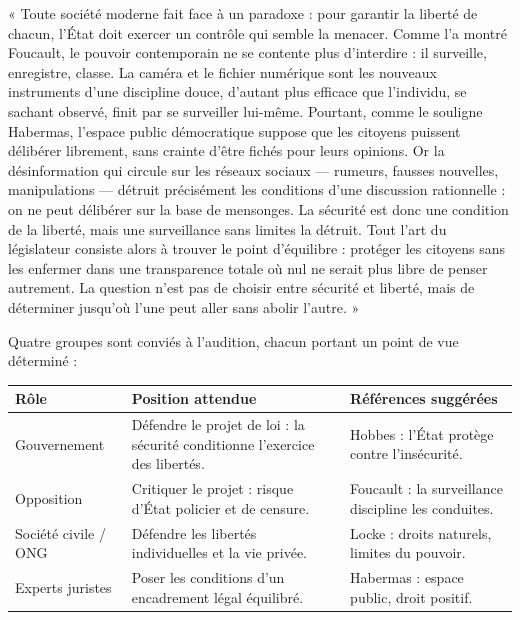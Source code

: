 \documentclass[11pt]{article}
\begin{document}
\begin{exemplebox}
« Toute société moderne fait face à un paradoxe : pour garantir la liberté de chacun, l'État doit exercer un contrôle qui semble la menacer. Comme l'a montré Foucault, le pouvoir contemporain ne se contente plus d'interdire : il surveille, enregistre, classe. La caméra et le fichier numérique sont les nouveaux instruments d'une discipline douce, d'autant plus efficace que l'individu, se sachant observé, finit par se surveiller lui-même. Pourtant, comme le souligne Habermas, l'espace public démocratique suppose que les citoyens puissent délibérer librement, sans crainte d'être fichés pour leurs opinions. Or la désinformation qui circule sur les réseaux sociaux — rumeurs, fausses nouvelles, manipulations — détruit précisément les conditions d'une discussion rationnelle : on ne peut délibérer sur la base de mensonges. La sécurité est donc une condition de la liberté, mais une surveillance sans limites la détruit. Tout l'art du législateur consiste alors à trouver le point d'équilibre : protéger les citoyens sans les enfermer dans une transparence totale où nul ne serait plus libre de penser autrement. La question n'est pas de choisir entre sécurité et liberté, mais de déterminer jusqu'où l'une peut aller sans abolir l'autre. »
\end{exemplebox}

Quatre groupes sont conviés à l'audition, chacun portant un point de vue déterminé :

\begin{center}
\begin{tabularx}{\linewidth}{|l|X|X|}\hline
\rowcolor{popblueL} \textbf{Rôle} & \textbf{Position attendue} & \textbf{Références suggérées} \\ \hline
Gouvernement & Défendre le projet de loi : la sécurité conditionne l'exercice des libertés. & Hobbes : l'État protège contre l'insécurité. \\ \hline
Opposition & Critiquer le projet : risque d'État policier et de censure. & Foucault : la surveillance discipline les conduites. \\ \hline
Société civile / ONG & Défendre les libertés individuelles et la vie privée. & Locke : droits naturels, limites du pouvoir. \\ \hline
Experts juristes & Poser les conditions d'un encadrement légal équilibré. & Habermas : espace public, droit positif. \\ \hline
\end{tabularx}
\end{center}
\end{document}
